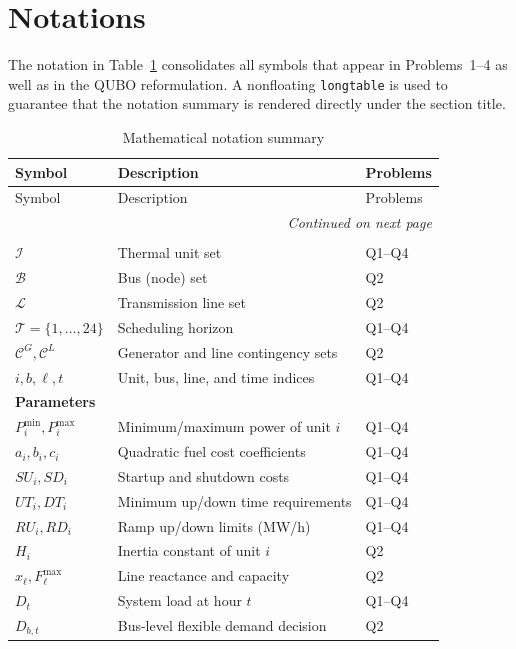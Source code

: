 \documentclass{apmcmthesis}
\begin{document}
\section{Notations}
The notation in Table~\ref{tab:notation} consolidates all symbols that appear in Problems~1--4 as well as in the QUBO reformulation. A nonfloating \texttt{longtable} is used to guarantee that the notation summary is rendered directly under the section title.

\begin{longtable}{@{}p{2.4cm}p{6.2cm}p{2.2cm}@{}}
\caption{Mathematical notation summary}\label{tab:notation}\\
\toprule
Symbol & Description & Problems\\
\midrule
\endfirsthead
\toprule
Symbol & Description & Problems\\
\midrule
\endhead
\midrule
\multicolumn{3}{r}{\textit{Continued on next page}}\\
\midrule
\endfoot
\bottomrule
\endlastfoot
\multicolumn{3}{l}{\textbf{Sets and indices}}\\
$\mathcal{I}$ & Thermal unit set & Q1--Q4\\
$\mathcal{B}$ & Bus (node) set & Q2\\
$\mathcal{L}$ & Transmission line set & Q2\\
$\mathcal{T}=\{1,\dots,24\}$ & Scheduling horizon & Q1--Q4\\
$\mathcal{C}^G, \mathcal{C}^L$ & Generator and line contingency sets & Q2\\
$i,b,\ell,t$ & Unit, bus, line, and time indices & Q1--Q4\\
\midrule
\multicolumn{3}{l}{\textbf{Parameters}}\\
$P_i^{\min},P_i^{\max}$ & Minimum/maximum power of unit $i$ & Q1--Q4\\
$a_i,b_i,c_i$ & Quadratic fuel cost coefficients & Q1--Q4\\
$SU_i,SD_i$ & Startup and shutdown costs & Q1--Q4\\
$UT_i,DT_i$ & Minimum up/down time requirements & Q1--Q4\\
$RU_i,RD_i$ & Ramp up/down limits (MW/h) & Q1--Q4\\
$H_i$ & Inertia constant of unit $i$ & Q2\\
$x_\ell,F_\ell^{\max}$ & Line reactance and capacity & Q2\\
$D_t$ & System load at hour $t$ & Q1--Q4\\
$D_{b,t}$ & Bus-level flexible demand decision & Q2\\

\end{longtable}
\end{document}
